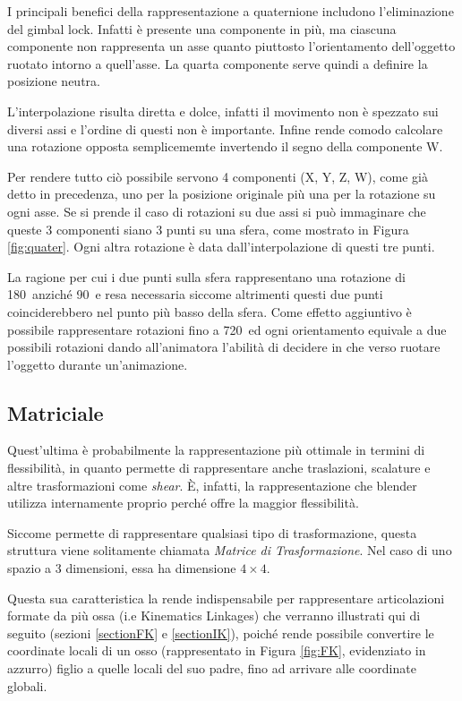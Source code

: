 I principali benefici della rappresentazione a quaternione includono l'eliminazione del gimbal lock. Infatti è presente una componente in più, ma ciascuna componente non rappresenta un asse quanto piuttosto l'orientamento dell'oggetto ruotato intorno a quell'asse. La quarta componente serve quindi a definire la posizione neutra.

L'interpolazione risulta diretta e dolce, infatti il movimento non è spezzato sui diversi assi e l'ordine di questi non è importante. Infine rende comodo calcolare una rotazione opposta semplicememte invertendo il segno della componente W.

Per rendere tutto ciò possibile servono 4 componenti (X, Y, Z, W), come già detto in precedenza, uno per la posizione originale più una per la rotazione su ogni asse. Se si prende il caso di rotazioni su due assi si può immaginare che queste 3 componenti siano 3 punti su una sfera, come mostrato in Figura \ref{fig:quater}. Ogni altra rotazione è data dall'interpolazione di questi tre punti.

La ragione per cui i due punti sulla sfera rappresentano una rotazione di 180\textdegree\ anziché 90\textdegree\ e resa necessaria siccome altrimenti questi due punti coinciderebbero nel punto più basso della sfera. Come effetto aggiuntivo è possibile rappresentare rotazioni fino a 720\textdegree\ ed ogni orientamento equivale a due possibili rotazioni dando all'animatora l'abilità di decidere in che verso ruotare l'oggetto durante un'animazione. 

\subsection{Matriciale}
Quest'ultima è probabilmente la rappresentazione più ottimale in termini di flessibilità, in quanto permette di rappresentare anche traslazioni, scalature e altre trasformazioni come \emph{shear}. È, infatti, la rappresentazione che blender utilizza internamente \cite{blendApi} \cite{nat2012rig} proprio perché offre la maggior flessibilità.

Siccome permette di rappresentare qualsiasi tipo di trasformazione, questa struttura viene solitamente chiamata \emph{Matrice di Trasformazione}. Nel caso di uno spazio a 3 dimensioni, essa ha dimensione $4\times4$.

Questa sua caratteristica la rende indispensabile per rappresentare articolazioni formate da più ossa (i.e Kinematics Linkages) che verranno illustrati qui di seguito (sezioni \ref{sectionFK} e \ref{sectionIK}), poiché rende possibile convertire le coordinate locali di un osso (rappresentato in Figura \ref{fig:FK}, evidenziato in azzurro) figlio a quelle locali del suo padre, fino ad arrivare alle coordinate globali.

